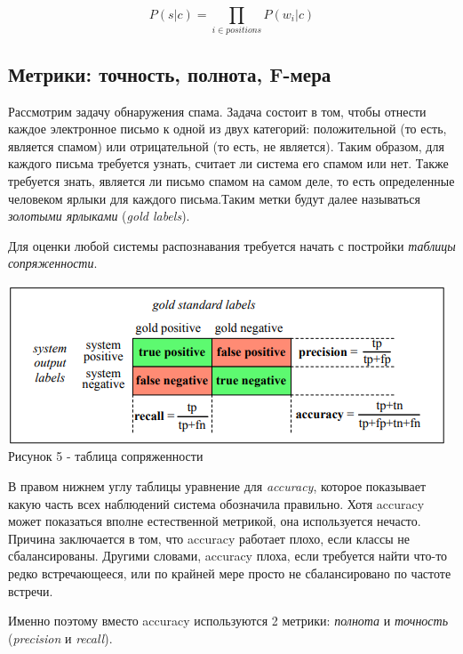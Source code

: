 \documentclass[a4paper,12pt,preview]{report} %
\begin{document}
	 \begin{equation}
	 	P(s | c) = \prod_{i \in positions} P(w_i | c) 
	 \end{equation}
	 
	 \subsection{Метрики: точность, полнота, F-мера}
	 
	 Рассмотрим задачу обнаружения спама. Задача состоит в том, чтобы отнести каждое электронное письмо к одной из двух категорий: положительной (то есть, является спамом) или отрицательной (то есть, не является). Таким образом, для каждого письма требуется узнать, считает ли система его спамом или нет. Также требуется знать, является ли письмо спамом на самом деле, то есть определенные человеком ярлыки для каждого письма.Таким метки будут далее называться \textit{золотыми ярлыками} (\textit{gold labels}).
	 
	 Для оценки любой системы распознавания требуется начать с постройки \textit{таблицы сопряженности}.
	 
	 \begin{center}
	 	\includegraphics[scale=0.9]{conttable.PNG}
	 	\\Рисунок 5 - таблица сопряженности
	 \end{center}
	 
	 В правом нижнем углу таблицы уравнение для \textit{accuracy}, которое показывает какую часть всех наблюдений система обозначила правильно. Хотя accuracy может показаться вполне естественной метрикой, она используется нечасто. Причина заключается в том, что accuracy работает плохо, если классы не сбалансированы. Другими словами, accuracy плоха, если требуется найти что-то редко встречающееся, или по крайней мере просто не сбалансировано по частоте встречи. 
	 
	 Именно поэтому вместо accuracy используются 2 метрики: \textit{полнота} и \textit{точность} (\textit{precision} и \textit{recall}).
	 
\end{document}
